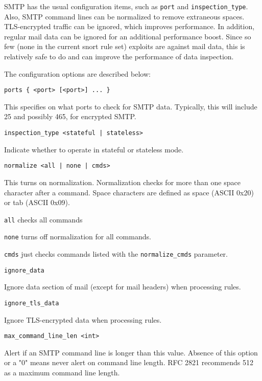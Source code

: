 \documentclass[english]{report}
\newcounter{slistnum}
\newenvironment{slist}
{ \begin{list}{ {\bf \arabic{slistnum}.} }{\usecounter{slistnum} } }
{ \end{list} }
\begin{document}
SMTP has the usual configuration items, such as \texttt{port} and \texttt{inspection\_type}.
Also, SMTP command lines can be normalized to remove extraneous spaces.
TLS-encrypted traffic can be ignored, which improves performance.  In addition,
regular mail data can be ignored for an additional performance boost.  Since
so few (none in the current snort rule set) exploits are against mail data,
this is relatively safe to do and can improve the performance of data
inspection.

The configuration options are described below:

\begin{slist}

\item \texttt{ports \{ <port> [<port>] ... \}}

This specifies on what ports to check for SMTP data.  Typically, this will
include 25 and possibly 465, for encrypted SMTP.

\item \texttt{inspection\_type <stateful | stateless>}

Indicate whether to operate in stateful or stateless mode.

\item \texttt{normalize <all | none | cmds>}

This turns on normalization.  Normalization checks for more than one space
character after a command.  Space characters are defined as space (ASCII 0x20)
or tab (ASCII 0x09).

\texttt{all} checks all commands

\texttt{none} turns off normalization for all commands.

\texttt{cmds} just checks commands listed with the \texttt{normalize\_cmds} parameter.

\item \texttt{ignore\_data}

Ignore data section of mail (except for mail headers) when processing rules.

\item \texttt{ignore\_tls\_data}

Ignore TLS-encrypted data when processing rules.

\item \texttt{max\_command\_line\_len <int>}

Alert if an SMTP command line is longer than this value.  Absence of this
option or a "0" means never alert on command line length.
RFC 2821 recommends 512 as a maximum command line length.


\end{slist}
\end{document}
